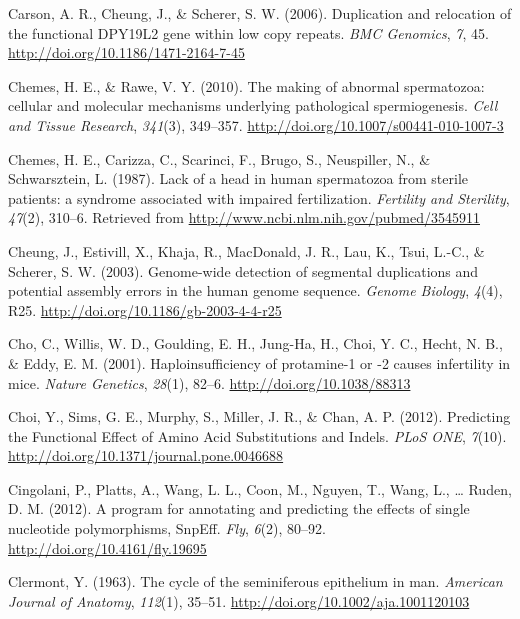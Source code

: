 \documentclass[12pt,twoside]{reedthesis}
\theoremstyle{definition}
\theoremstyle{definition}
\theoremstyle{remark}
\begin{document}
  \hypertarget{ref-Carson2006}{}
  Carson, A. R., Cheung, J., \& Scherer, S. W. (2006). Duplication and
  relocation of the functional DPY19L2 gene within low copy repeats.
  \emph{BMC Genomics}, \emph{7}, 45.
  \url{http://doi.org/10.1186/1471-2164-7-45}
  
  \hypertarget{ref-Chemes2010}{}
  Chemes, H. E., \& Rawe, V. Y. (2010). The making of abnormal
  spermatozoa: cellular and molecular mechanisms underlying pathological
  spermiogenesis. \emph{Cell and Tissue Research}, \emph{341}(3),
  349--357. \url{http://doi.org/10.1007/s00441-010-1007-3}
  
  \hypertarget{ref-Chemes1987}{}
  Chemes, H. E., Carizza, C., Scarinci, F., Brugo, S., Neuspiller, N., \&
  Schwarsztein, L. (1987). Lack of a head in human spermatozoa from
  sterile patients: a syndrome associated with impaired fertilization.
  \emph{Fertility and Sterility}, \emph{47}(2), 310--6. Retrieved from
  \url{http://www.ncbi.nlm.nih.gov/pubmed/3545911}
  
  \hypertarget{ref-Cheung2003}{}
  Cheung, J., Estivill, X., Khaja, R., MacDonald, J. R., Lau, K., Tsui,
  L.-C., \& Scherer, S. W. (2003). Genome-wide detection of segmental
  duplications and potential assembly errors in the human genome sequence.
  \emph{Genome Biology}, \emph{4}(4), R25.
  \url{http://doi.org/10.1186/gb-2003-4-4-r25}
  
  \hypertarget{ref-Cho2001}{}
  Cho, C., Willis, W. D., Goulding, E. H., Jung-Ha, H., Choi, Y. C.,
  Hecht, N. B., \& Eddy, E. M. (2001). Haploinsufficiency of protamine-1
  or -2 causes infertility in mice. \emph{Nature Genetics}, \emph{28}(1),
  82--6. \url{http://doi.org/10.1038/88313}
  
  \hypertarget{ref-Choi2012}{}
  Choi, Y., Sims, G. E., Murphy, S., Miller, J. R., \& Chan, A. P. (2012).
  Predicting the Functional Effect of Amino Acid Substitutions and Indels.
  \emph{PLoS ONE}, \emph{7}(10).
  \url{http://doi.org/10.1371/journal.pone.0046688}
  
  \hypertarget{ref-Cingolani2012}{}
  Cingolani, P., Platts, A., Wang, L. L., Coon, M., Nguyen, T., Wang, L.,
  \ldots{} Ruden, D. M. (2012). A program for annotating and predicting
  the effects of single nucleotide polymorphisms, SnpEff. \emph{Fly},
  \emph{6}(2), 80--92. \url{http://doi.org/10.4161/fly.19695}
  
  \hypertarget{ref-Clermont1963}{}
  Clermont, Y. (1963). The cycle of the seminiferous epithelium in man.
  \emph{American Journal of Anatomy}, \emph{112}(1), 35--51.
  \url{http://doi.org/10.1002/aja.1001120103}
  
\end{document}

